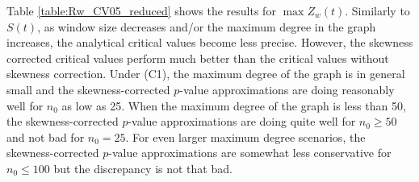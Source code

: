 \documentclass[arxiv, preprint]{imsart}
\numberwithin{equation}{section}
\theoremstyle{plain}
\begin{document}


Table \ref{table:Rw_CV05_reduced} shows the results for $\max Z_w(t)$. Similarly to $S(t)$, as window size decreases and/or the maximum degree in the graph increases, the analytical critical values become less precise. However, the skewness corrected critical values perform much better than the critical values without skewness correction.  Under (C1), the maximum degree of the graph is in general small and the skewness-corrected $p$-value approximations are doing reasonably well for $n_0$ as low as 25.   When the maximum degree of the graph is less than 50, the skewness-corrected $p$-value approximations are doing quite well for $n_0\geq 50$ and not bad for $n_0=25$.  
For even larger maximum degree scenarios, the skewness-corrected $p$-value approximations are somewhat less conservative for $n_0\leq 100$ but the discrepancy is not that bad.

\end{document}
